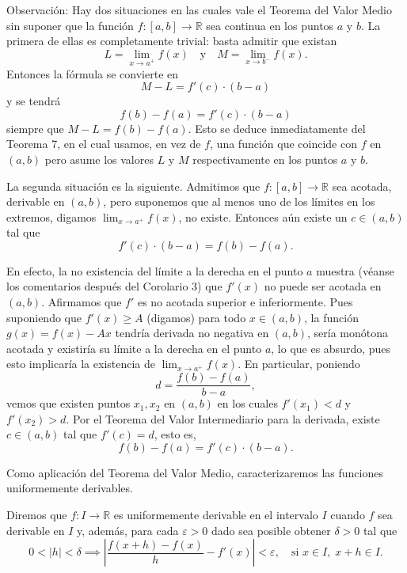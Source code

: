 \documentclass[12pt,oneside]{book}
\begin{document}
Observación: Hay dos situaciones en las cuales vale el Teorema del Valor Medio sin suponer que la función \( f: [a, b] \to \mathbb{R} \) sea continua en los puntos \( a \) y \( b \). La primera de ellas es completamente trivial: basta admitir que existan
\[
L = \lim_{x \to a^+} f(x) \quad \text{y} \quad M = \lim_{x \to b^-} f(x).
\]
Entonces la fórmula se convierte en
\[
M - L = f'(c) \cdot (b - a)
\]
y se tendrá
\[
f(b) - f(a) = f'(c) \cdot (b - a)
\]
siempre que \( M - L = f(b) - f(a) \). Esto se deduce inmediatamente del Teorema 7, en el cual usamos, en vez de \( f \), una función que coincide con \( f \) en \( (a, b) \) pero asume los valores \( L \) y \( M \) respectivamente en los puntos \( a \) y \( b \).

La segunda situación es la siguiente. Admitimos que \( f: [a, b] \to \mathbb{R} \) sea acotada, derivable en \( (a, b) \), pero suponemos que al menos uno de los límites en los extremos, digamos \( \lim_{x \to a^+} f(x) \), no existe. Entonces aún existe un \( c \in (a, b) \) tal que
\[
f'(c) \cdot (b - a) = f(b) - f(a).
\]

En efecto, la no existencia del límite a la derecha en el punto \( a \) muestra (véanse los comentarios después del Corolario 3) que \( f'(x) \) no puede ser acotada en \( (a, b) \). Afirmamos que \( f' \) es no acotada superior e inferiormente. Pues suponiendo que \( f'(x) \geq A \) (digamos) para todo \( x \in (a, b) \), la función \( g(x) = f(x) - Ax \) tendría derivada no negativa en \( (a, b) \), sería monótona acotada y existiría su límite a la derecha en el punto \( a \), lo que es absurdo, pues esto implicaría la existencia de \( \lim_{x \to a^+} f(x) \). En particular, poniendo
\[
d = \frac{f(b) - f(a)}{b - a},
\]
vemos que existen puntos \( x_1, x_2 \) en \( (a, b) \) en los cuales \( f'(x_1) < d \) y \( f'(x_2) > d \). Por el Teorema del Valor Intermediario para la derivada, existe \( c \in (a, b) \) tal que \( f'(c) = d \), esto es,
\[
f(b) - f(a) = f'(c) \cdot (b - a).
\]

Como aplicación del Teorema del Valor Medio, caracterizaremos las funciones uniformemente derivables.

Diremos que \( f: I \to \mathbb{R} \) es uniformemente derivable en el intervalo \( I \) cuando \( f \) sea derivable en \( I \) y, además, para cada \( \varepsilon > 0 \) dado sea posible obtener \( \delta > 0 \) tal que
\[
0 < |h| < \delta \implies \left| \frac{f(x+h) - f(x)}{h} - f'(x) \right| < \varepsilon, \quad \text{si } x \in I, \; x+h \in I.
\]
\end{document}

